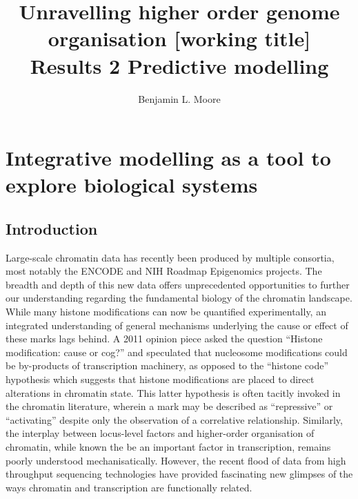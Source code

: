 \documentclass[a4paper,11pt,oneside]{book}
\title{ \vspace{3in} Unravelling higher order genome organisation {\small [working
    title]} \\ \vspace{2em} {\large {\bf Results 2} Predictive modelling } }
\author{Benjamin L. Moore}
\begin{document}
\maketitle

\chapter{Integrative modelling as a tool to explore biological systems}
\vspace{2em}

\section{Introduction}
Large-scale chromatin data has recently been produced by multiple
consortia, most notably the ENCODE\cite{Gerstein2012} and NIH
Roadmap Epigenomics\cite{Bernstein2010} projects. The breadth and depth of this new
data offers unprecedented opportunities to further our understanding
regarding the fundamental biology of the chromatin landscape. While many histone
modifications can now be quantified experimentally,\cite{Nikolov2012, Sajan2012, Ernst2011} an integrated
understanding of general mechanisms underlying the cause or effect of
these marks lags behind. A 2011 opinion piece asked
the question ``Histone modification: cause or
cog?''\cite{Henikoff2011} and speculated that nucleosome modifications
could be by-products of transcription machinery, as opposed to
the ``histone code'' hypothesis which suggests that histone
modifications are placed to direct alterations in chromatin
state. This latter hypothesis is often tacitly invoked in the
chromatin literature, wherein a mark may be described as
``repressive'' or ``activating'' despite only the observation of a
correlative relationship.\cite{Henikoff2011} Similarly, the interplay
between locus-level factors and higher-order organisation of
chromatin, while known the be an important factor in
transcription, remains poorly understood mechanisatically.\cite{Li2011} 
However, the recent flood of data from high throughput sequencing technologies have provided fascinating new glimpses of the ways chromatin and transcription are functionally related.
\end{document}
